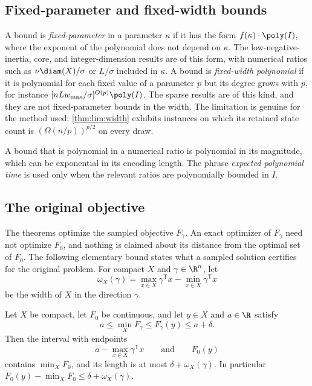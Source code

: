 \subsection{Fixed-parameter and fixed-width bounds}\label{sec:model:parameters}

A bound is \emph{fixed-parameter} in a parameter $\kappa$ if it has the form
$f(\kappa)\cdot\poly(I)$, where the exponent of the polynomial does not
depend on $\kappa$. The low-negative-inertia, core, and integer-dimension
results are of this form, with numerical ratios such as
$\nu\diam(X)/\sigma$ or $L/\sigma$ included in $\kappa$. A bound is
\emph{fixed-width polynomial} if it is polynomial for each fixed value of a
parameter $p$ but its degree grows with $p$, for instance
$[nLw_{\max}/\sigma]^{O(p)}\poly(I)$. The sparse results are of this kind,
and they are not fixed-parameter bounds in the width. The limitation is
genuine for the method used: \cref{thm:lim:width} exhibits instances on
which its retained state count is $(\Omega(n/p))^{p/2}$ on every draw.

A bound that is polynomial in a numerical ratio is polynomial in its
magnitude, which can be exponential in its encoding length. The phrase
\emph{expected polynomial time} is used only when the relevant ratios are
polynomially bounded in $I$.

\subsection{The original objective}\label{sec:model:original}

The theorems optimize the sampled objective $F_\gamma$. An exact optimizer
of $F_\gamma$ need not optimize $F_0$, and nothing is claimed about its
distance from the optimal set of $F_0$. The following elementary bound states
what a sampled solution certifies for the original problem. For compact $X$
and $\gamma\in\R^n$, let
\[
 \omega_X(\gamma)=\max_{x\in X}\gamma^{\mathsf T}x-\min_{x\in X}\gamma^{\mathsf T}x
\]
be the width of $X$ in the direction $\gamma$.

\begin{proposition}\label{prop:model:regret}
Let $X$ be compact, let $F_0$ be continuous, and let $y\in X$ and $a\in\R$
satisfy
\[
 a\le\min_XF_\gamma\le F_\gamma(y)\le a+\delta.
\]
Then the interval with endpoints
\[
 a-\max_{x\in X}\gamma^{\mathsf T}x\qquad\text{and}\qquad F_0(y)
\]
contains $\min_XF_0$, and its length is at most $\delta+\omega_X(\gamma)$. In
particular $F_0(y)-\min_XF_0\le\delta+\omega_X(\gamma)$.
\end{proposition}

